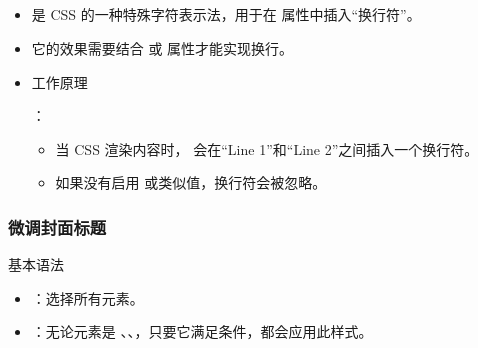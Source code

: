 \documentclass[letterpaper,10pt,english]{sphinxmanual}
\begin{document}
\subsection{}
\label{\detokenize{formatting/css-pdf:a}}\begin{itemize}
\item {} 
\sphinxAtStartPar
{} 是 CSS 的一种特殊字符表示法，用于在  属性中插入“换行符”。

\item {} 
\sphinxAtStartPar
它的效果需要结合  或  属性才能实现换行。

\item {} 
\sphinxAtStartPar
工作原理

\sphinxAtStartPar
：
\begin{itemize}
\item {} 
\sphinxAtStartPar
当 CSS 渲染内容时， 会在“Line 1”和“Line 2”之间插入一个换行符。

\item {} 
\sphinxAtStartPar
如果没有启用  或类似值，换行符会被忽略。

\end{itemize}

\end{itemize}


\subsubsection{微调封面标题}
\label{\detokenize{formatting/css-pdf:id8}}
\sphinxAtStartPar
基本语法

\sphinxAtStartPar
{}
\begin{itemize}
\item {} 
\sphinxAtStartPar
{}：选择所有元素。

\item {} 
\sphinxAtStartPar
{}：无论元素是 、、，只要它满足条件，都会应用此样式。

\end{itemize}
\end{document}
